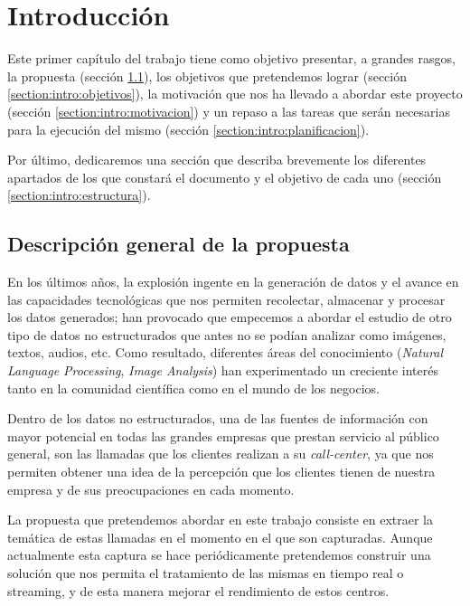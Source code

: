 \chapter{Introducción}
\label{chapter:introduccion}

Este primer capítulo del trabajo tiene como objetivo presentar, a grandes rasgos, la propuesta (sección \ref{section:intro:descripcion}), los objetivos que pretendemos lograr (sección \ref{section:intro:objetivos}), la motivación que nos ha llevado a abordar este proyecto (sección \ref{section:intro:motivacion}) y un repaso a las tareas que serán necesarias para la ejecución del mismo (sección \ref{section:intro:planificacion}). 

Por último, dedicaremos una sección que describa brevemente los diferentes apartados de los que constará el documento y el objetivo de cada uno (sección \ref{section:intro:estructura}).

\section{Descripción general de la propuesta}
\label{section:intro:descripcion}
En los últimos años, la explosión ingente en la generación de datos y el avance en las capacidades tecnológicas que nos permiten recolectar, almacenar y procesar los datos generados; han provocado que empecemos a abordar el estudio de otro tipo de datos no estructurados que antes no se podían analizar como imágenes, textos, audios, etc. Como resultado, diferentes áreas del conocimiento (\textit{Natural Language Processing}, \textit{Image Analysis}) han experimentado un creciente interés tanto en la comunidad científica como en el mundo de los negocios. 


Dentro de los datos no estructurados, una de las fuentes de información con mayor potencial en todas las grandes empresas que prestan servicio al público general, son las llamadas que los clientes realizan a su \textit{call-center}, ya que nos permiten obtener una idea de la percepción que los clientes tienen de nuestra empresa y de sus preocupaciones en cada momento. 

La propuesta que pretendemos abordar en este trabajo consiste en extraer la temática de  estas llamadas en el momento en el que son capturadas. Aunque actualmente esta captura se hace periódicamente pretendemos construir una solución que nos permita el tratamiento de las mismas en tiempo real o streaming, y de esta manera mejorar el rendimiento de estos centros. %

